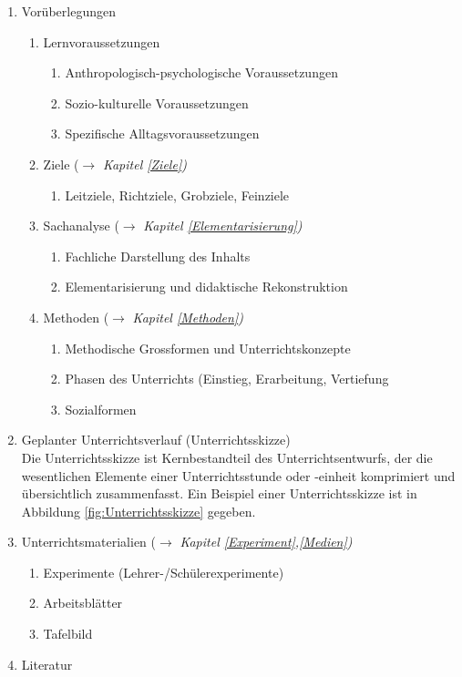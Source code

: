 \begin{enumerate}
\item Vor\"{u}berlegungen

	\begin{enumerate}
	\item Lernvoraussetzungen
		\begin{enumerate}
		\item Anthropologisch-psychologische Voraussetzungen
		\item Sozio-kulturelle Voraussetzungen
		\item Spezifische Alltagsvoraussetzungen
		\end{enumerate}
	\item	Ziele ($\to$ \emph{Kapitel \ref{Ziele})}
		\begin{enumerate}
		\item Leitziele, Richtziele, Grobziele, Feinziele
		\end{enumerate}
	\item Sachanalyse ($\to$ \emph{Kapitel \ref{Elementarisierung})}
		\begin{enumerate}
		\item Fachliche Darstellung des Inhalts
		\item Elementarisierung und didaktische Rekonstruktion
		\end{enumerate}
	\item Methoden ($\to$ \emph{Kapitel \ref{Methoden})}
		\begin{enumerate}
		\item Methodische Grossformen und Unterrichtskonzepte
		\item Phasen des Unterrichts (Einstieg, Erarbeitung, Vertiefung
		\item Sozialformen
		\end{enumerate}
	\end{enumerate}

\item  Geplanter Unterrichtsverlauf (Unterrichtsskizze) 
	\\
	 Die Unterrichtsskizze ist Kernbestandteil des Unterrichtsentwurfs, der die wesentlichen Elemente einer Unterrichtsstunde oder -einheit komprimiert und \"{u}bersichtlich zusammenfasst. Ein Beispiel einer Unterrichtsskizze ist in Abbildung \ref{fig:Unterrichtsskizze} gegeben.

\item Unterrichtsmaterialien ($\to$ \emph{Kapitel \ref{Experiment},\ref{Medien})}
	\begin{enumerate}
	\item Experimente (Lehrer-/Sch\"{u}lerexperimente)
	\item Arbeitsbl\"{a}tter
	\item Tafelbild
	\end{enumerate}

\item Literatur
\end{enumerate}

